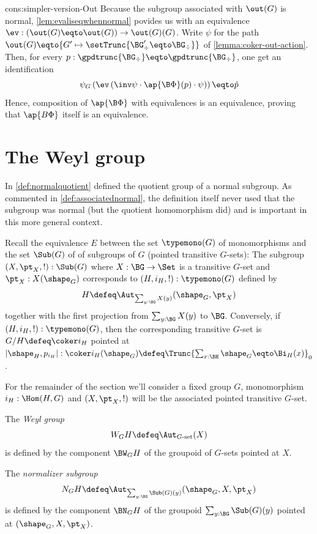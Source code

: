 \begin{implementation}{cons:simpler-version-Out}
  Because the subgroup associated with $\out(G)$ is normal,
  \cref{lem:evaliseqwhennormal} povides us with an equivalence
  $\ev : (\out(G) \eqto \out(G)) \to \out(G)(G)$. Write $\psi$ for the path
  $\out(G) \eqto {G' \mapsto \setTrunc{\BG'_\div \eqto \BG_\div}}$ of
  \cref{lemma:coker-out-action}. Then, for every
  $p:\gpdtrunc{\BG_\div} \eqto \gpdtrunc{\BG_\div}$, one get an identification
  \begin{displaymath}
    \psi_G \left(
      \ev \left( \inv\psi \cdot \ap{\B\Phi} (p) \cdot \psi \right)
    \right) \eqto \hat p
  \end{displaymath}
  Hence, composition of $\ap{\B\Phi}$ with equivalences is an equivalence,
  proving that $\ap{B\Phi}$ itself is an equivalence.
\end{implementation}


\section{The Weyl group}
\label{sec:Weyl}

In \cref{def:normalquotient} defined the quotient group of a normal subgroup.
As commented in \cref{def:associatednormal}, the definition itself never used that the subgroup was normal (but the quotient homomorphism did) and is important in this more general context.

Recall the equivalence $E$ between the set $\typemono(G)$ of monomorphisms and the set $\Sub(G)$ of of subgroups of $G$ (pointed transitive $G$-sets): The subgroup $(X,\pt_X,!):\Sub(G)$ where $X:\BG\to\Set$ is a transitive $G$-set and $\pt_X:X(\sh_G)$ corresponds to $(H,i_H,!):\typemono(G)$ defined by
$$H\defeq\Aut_{\sum_{y:\BG}X(y)}(\sh_G,\pt_X)
$$ together with the first projection from $\sum_{y:\BG}X(y)$ to $\BG$.  Conversely, if $(H,i_H,!):\typemono(G)$, then the corresponding transitive $G$-set is $G/H\defeq\coker i_H$ pointed at $|\sh_H,p_{i_H}|:\coker i_H(\sh_G)\defeq\Trunc{\sum_{x:\BH}\sh_G\eqto \Bi_H(x)}_0$.

For the remainder of the section we'll consider a fixed group $G$, monomorphism $i_H:\Hom(H,G)$ and $(X,\pt_X,!)$ will be the associated pointed transitive $G$-set.
\begin{definition}

The \emph{Weyl group} \label{def:Weyl}
$$W_GH\defeq\Aut_{G\text{-set}}(X)$$ is defined by the component $\BW_GH$ of the groupoid of $G$-sets pointed at $X$.

The \emph{normalizer subgroup} \label{def:normalizer}
$$N_GH\defeq\Aut_{\sum_{y:\BG}\Sub(G)(y)}(\sh_G,X,\pt_X)$$ is defined by the component $\BN_GH$ of the groupoid $\sum_{y:\BG}\Sub(G)(y)$ pointed at $(\sh_G,X,\pt_X)$.
\end{definition}

